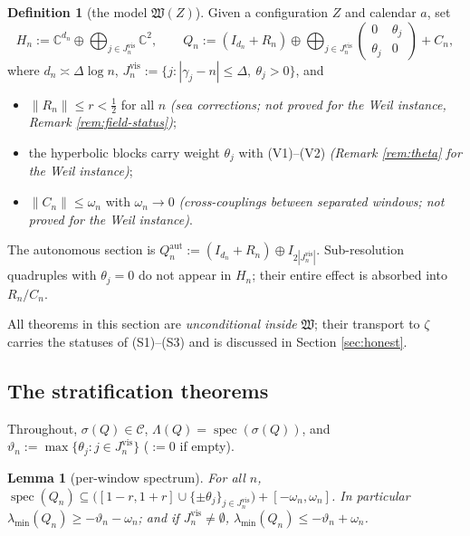 \documentclass[11pt,reqno]{amsart}
\newtheorem{lemma}[theorem]{Lemma}
\theoremstyle{definition}
\newtheorem{definition}[theorem]{Definition}
\newcommand{\Cor}{\mathcal{C}}
\newcommand{\spec}{\operatorname{spec}}
\newcommand{\C}{\mathbb{C}}
\newcommand{\Qaut}{Q^{\mathrm{aut}}}
\newcommand{\half}{\tfrac12}
\begin{document}
\begin{definition}[the model \(\mathfrak W(Z)\)]\label{def:model}
Given a configuration \(Z\) and calendar \(a\), set
\[
H_n:=\C^{d_n}\oplus\bigoplus_{j\in J_n^{\mathrm{vis}}}\C^2,\qquad
Q_n:=(I_{d_n}+R_n)\oplus\bigoplus_{j\in J_n^{\mathrm{vis}}}
\begin{pmatrix}0&\theta_j\\\theta_j&0\end{pmatrix}+C_n,
\]
where \(d_n\asymp\Delta\log n\),
\(J_n^{\mathrm{vis}}:=\{j:|\gamma_j-n|\leq\Delta,\ \theta_j>0\}\), and
\begin{itemize}
\item[\textup{(S1)}] \(\|R_n\|\leq r<\half\) for all \(n\) \emph{(sea
corrections; not proved for the Weil instance, Remark \ref{rem:field-status})};
\item[\textup{(S2)}] the hyperbolic blocks carry weight \(\theta_j\) with
(V1)--(V2) \emph{(Remark \ref{rem:theta} for the Weil instance)};
\item[\textup{(S3)}] \(\|C_n\|\leq\omega_n\) with \(\omega_n\to0\)
\emph{(cross-couplings between separated windows; not proved for the Weil
instance)}.
\end{itemize}
The autonomous section is \(\Qaut_n:=(I_{d_n}+R_n)\oplus
I_{2|J_n^{\mathrm{vis}}|}\). Sub-resolution quadruples with \(\theta_j=0\) do not
appear in \(H_n\); their entire effect is absorbed into \(R_n/C_n\).
\end{definition}

All theorems in this section are \emph{unconditional inside} \(\mathfrak W\);
their transport to \(\zeta\) carries the statuses of (S1)--(S3) and is discussed
in Section \ref{sec:honest}.

\subsection{The stratification theorems}
Throughout, \(\sigma(Q)\in\Cor\), \(\Lambda(Q)=\spec(\sigma(Q))\), and
\(\vartheta_n:=\max\{\theta_j:j\in J_n^{\mathrm{vis}}\}\) (\(:=0\) if empty).

\begin{lemma}[per-window spectrum]\label{lem:window-spec}
For all \(n\),
\(\spec(Q_n)\subseteq\bigl([1-r,1+r]\cup\{\pm\theta_j\}_{j\in J_n^{\mathrm{vis}}}
\bigr)+[-\omega_n,\omega_n]\). In particular
\(\lambda_{\min}(Q_n)\geq-\vartheta_n-\omega_n\); and if
\(J_n^{\mathrm{vis}}\neq\emptyset\),
\(\lambda_{\min}(Q_n)\leq-\vartheta_n+\omega_n\).
\end{lemma}
\end{document}
